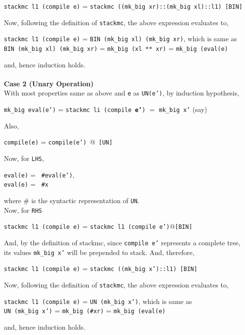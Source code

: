\documentclass{article}
\begin{document}
    \begin{center}
        {\small \texttt{stackmc l1 (compile e)} = \texttt{stackmc ((mk\_big xr)::(mk\_big xl)::l1) [BIN]}}
    \end{center}
    Now, following the definition of \texttt{stackmc}, the above expression evaluates to,
    \begin{center}
        {\texttt{stackmc l1 (compile e)} = \texttt{BIN (mk\_big xl) (mk\_big xr)}}, {\tiny which is same as} \\[5pt]
        {\small \texttt{BIN (mk\_big xl) (mk\_big xr)} = \texttt{mk\_big (xl ** xr)} = \texttt{mk\_big (eval(e)}}
    \end{center}
    and, hence induction holds. \\
\pagebreak
\\
\textbf{Case 2 (Unary Operation)} \\ [5 pt]
With most properties same as above and \texttt{e} as \texttt{UN(e')}, by induction hypothesis,
\begin{center}
    \texttt{mk\_big eval(e')} =  \texttt{stackmc li (compile \textbf{e'})} \(=\) \texttt{mk\_big x'} (say) 
\end{center}
Also,
    \begin{center}
        \texttt{compile(e)} = \texttt{compile(e') $@$ [UN]}
    \end{center}
    Now, for \texttt{LHS}, 
    \begin{center}
        \texttt{eval(e)} = \texttt{ \#eval(e')},\\
        \texttt{eval(e)} = \texttt{ \#x}                               
    \end{center}
    where \# is the syntactic representation of \texttt{UN}. \\[5pt]
    Now, for \texttt{RHS} 
    \begin{center}
        {\small \texttt{stackmc l1 (compile e)} = \texttt{stackmc l1 (compile e')$@$[BIN]}}
    \end{center}
    And, by the definition of stackmc, since \texttt{compile e'} represents a complete tree, its values \texttt{mk\_big x'} will be prepended to stack. And, therefore,
    \begin{center}
        {\small \texttt{stackmc l1 (compile e)} = \texttt{stackmc ((mk\_big x')::l1) [BIN]}}
    \end{center}
    Now, following the definition of \texttt{stackmc}, the above expression evaluates to,
    \begin{center}
        {\texttt{stackmc l1 (compile e)} = \texttt{UN (mk\_big x')}}, {\tiny which is same as} \\[5pt]
        {\small \texttt{UN (mk\_big x')} = \texttt{mk\_big (\#xr)} = \texttt{mk\_big (eval(e)}}
    \end{center}
    and, hence induction holds. \\
\end{document}
